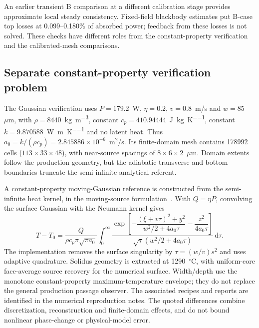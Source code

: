 \documentclass[preprint,12pt]{elsarticle}
\newcommand{\um}{\ensuremath{\mu\mathrm{m}}}
\begin{document}
An earlier transient B comparison at a different calibration stage provides approximate local steady consistency. Fixed-field blackbody estimates put B-case top losses at 0.099--0.180\% of absorbed power; feedback from these losses is not solved. These checks have different roles from the constant-property verification and the calibrated-mesh comparisons.

\subsection{Separate constant-property verification problem}
The Gaussian verification uses $P=179.2$~W, $\eta=0.2$, $v=0.8$~m/s and $w=85$~\um, with $\rho=8440$~\si{\kilogram\per\cubic\metre}, constant $c_p=410.94444$~\si{\joule\per\kilogram\per\kelvin}, constant $k=9.870588$~\si{\watt\per\metre\per\kelvin} and no latent heat. Thus $a_0=k/(\rho c_p)=2.845886\times10^{-6}$~m$^2$/s. Its finite-domain mesh contains 178992 cells ($113\times33\times48$), with near-source spacings of $8\times6\times2$~\um. Domain extents follow the production geometry, but the adiabatic transverse and bottom boundaries truncate the semi-infinite analytical referent.

A constant-property moving-Gaussian reference is constructed from the semi-infinite heat kernel, in the moving-source formulation~\cite{vanelsen2007}. With $Q=\eta P$, convolving the surface Gaussian with the Neumann kernel gives
\begin{equation}
 T-T_0=\frac{Q}{\rho c_p\pi\sqrt{\pi a_0}}
 \int_0^\infty \frac{\exp\!\left[-\dfrac{(\xi+v\tau)^2+y^2}{w^2/2+4a_0\tau}-\dfrac{z^2}{4a_0\tau}\right]}
 {\sqrt{\tau}(w^2/2+4a_0\tau)}\,\mathrm d\tau.
\end{equation}
The implementation removes the surface singularity by $\tau=(w/v)s^2$ and uses adaptive quadrature. Solidus geometry is extracted at 1290~$^\circ$C, with uniform-core face-average source recovery for the numerical surface. Width/depth use the monotone constant-property maximum-temperature envelope; they do not replace the general production passage observer. The associated recipes and reports are identified in the numerical reproduction notes. The quoted differences combine discretization, reconstruction and finite-domain effects, and do not bound nonlinear phase-change or physical-model error.
\end{document}
